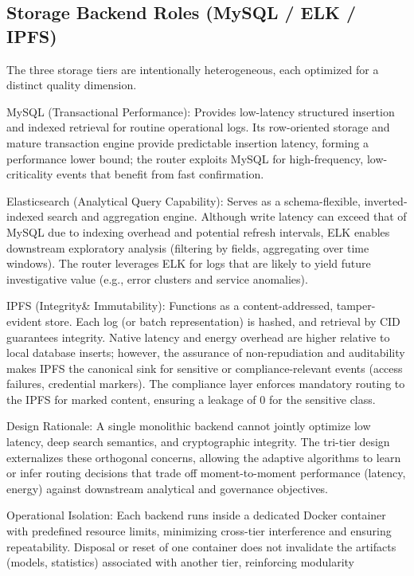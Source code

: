 \subsection{Storage Backend Roles (MySQL / ELK / IPFS)}

The three storage tiers are intentionally heterogeneous, each optimized for a distinct quality dimension.

MySQL (Transactional Performance): Provides low-latency structured insertion and indexed retrieval for routine operational logs. Its row-oriented storage and mature transaction engine provide predictable insertion latency, forming a performance lower bound; the router exploits MySQL for high-frequency, low-criticality events that benefit from fast confirmation.

Elasticsearch (Analytical Query Capability): Serves as a schema-flexible, inverted-indexed search and aggregation engine. Although write latency can exceed that of MySQL due to indexing overhead and potential refresh intervals, ELK enables downstream exploratory analysis (filtering by fields, aggregating over time windows). The router leverages ELK for logs that are likely to yield future investigative value (e.g., error clusters and service anomalies).

IPFS (Integrity\& Immutability): Functions as a content-addressed, tamper-evident store. Each log (or batch representation) is hashed, and retrieval by CID guarantees integrity. Native latency and energy overhead are higher relative to local database inserts; however, the assurance of non-repudiation and auditability makes IPFS the canonical sink for sensitive or compliance-relevant events (access failures, credential markers). The compliance layer enforces mandatory routing to the IPFS for marked content, ensuring a leakage of 0 for the sensitive class.

Design Rationale: A single monolithic backend cannot jointly optimize low latency, deep search semantics, and cryptographic integrity. The tri-tier design externalizes these orthogonal concerns, allowing the adaptive algorithms to learn or infer routing decisions that trade off moment-to-moment performance (latency, energy) against downstream analytical and governance objectives.

Operational Isolation: Each backend runs inside a dedicated Docker container with predefined resource limits, minimizing cross-tier interference and ensuring repeatability. Disposal or reset of one container does not invalidate the artifacts (models, statistics) associated with another tier, reinforcing modularity

